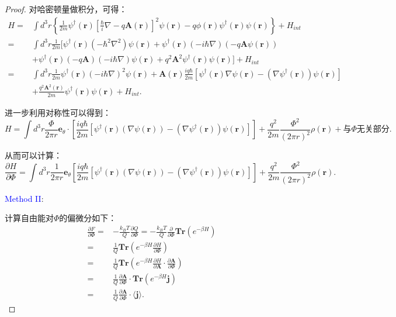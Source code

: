 \documentclass[reqno,a4paper,12pt]{amsart}
\begin{document}
\begin{proof}
对哈密顿量做积分，可得：
\begin{align*}
	H =& \int d^3 r \left\{ \frac{1}{2m}\psi^\dagger(\mathbf{r}) \left[ \frac{\hbar}{i}\nabla - q\mathbf{A}(\mathbf{r}) \right]^2 \psi(\mathbf{r}) - q\phi(\mathbf{r}) \psi^\dagger(\mathbf{r}) \psi(\mathbf{r}) \right\} + H_{int} \\
	=& \int d^3 r \frac{1}{2m} [ \psi^\dagger(\mathbf{r}) (-\hbar^2\nabla^2) \psi(\mathbf{r}) + \psi^\dagger(\mathbf{r})(-i\hbar\nabla)(-q\mathbf{A}\psi(\mathbf{r})) \\
	 &+ \psi^\dagger(\mathbf{r})(-q\mathbf{A})(-i\hbar\nabla)\psi(\mathbf{r}) + q^2\mathbf{A}^2 \psi^\dagger(\mathbf{r})\psi(\mathbf{r})] + H_{int} \\
	 =& \int d^3 r \frac{1}{2m}\psi^\dagger(\mathbf{r}) (-i\hbar\nabla)^2 \psi(\mathbf{r}) + \mathbf{A}(\mathbf{r})\frac{iq\hbar}{2m}[\psi^\dagger(\mathbf{r})\nabla\psi(\mathbf{r}) - (\nabla\psi^\dagger(\mathbf{r}))\psi(\mathbf{r})] \\
	 &+ \frac{q^2\mathbf{A}^2(\mathbf{r})}{2m} \psi^\dagger(\mathbf{r}) \psi(\mathbf{r}) + H_{int}.
\end{align*}

进一步利用对称性可以得到：
\[
	H = \int d^3 r \frac{\Phi}{2\pi r} \mathbf{e}_\theta \cdot \left[ \frac{iq\hbar}{2m}[\psi^\dagger(\mathbf{r})(\nabla \psi(\mathbf{r})) - (\nabla\psi^\dagger(\mathbf{r})) \psi(\mathbf{r})] \right] + \frac{q^2}{2m} \frac{\Phi^2}{(2\pi r)^2} \rho(\mathbf{r}) + \text{与$\Phi$无关部分}.
\]

从而可以计算：
\[
	\frac{\partial H}{\partial \Phi} = \int d^3 r \frac{1}{2\pi r} \mathbf{e}_\theta \left[ \frac{iq\hbar}{2m}[\psi^\dagger(\mathbf{r})(\nabla \psi(\mathbf{r})) - (\nabla\psi^\dagger(\mathbf{r})) \psi(\mathbf{r})] \right] + \frac{q^2}{2m} \frac{\Phi^2}{(2\pi r)^2} \rho(\mathbf{r}).
\]

\textcolor{blue}{Method II}:

计算自由能对$\Phi$的偏微分如下：
\begin{align*}
	\frac{\partial F}{\partial \Phi} =& -\frac{k_BT}{Q}\frac{\partial Q}{\partial \Phi} = -\frac{k_BT}{Q}\frac{\partial}{\partial \Phi} \mathbf{Tr}(e^{-\beta H}) \\
	=& \frac{1}{Q} \mathbf{Tr} \left( e^{-\beta H} \frac{\partial H}{\partial \Phi} \right) \\
	=& \frac{1}{Q} \mathbf{Tr} \left( e^{-\beta H} \frac{\partial H}{\partial \mathbf{A}} \cdot \frac{\partial \mathbf{A}}{\partial \Phi} \right) \\
	=& \frac{1}{Q} \frac{\partial \mathbf{A}}{\partial \Phi} \cdot \mathbf{Tr} \left( e^{-\beta H} \mathbf{j} \right) \\
	=& \frac{1}{Q} \frac{\partial \mathbf{A}}{\partial \Phi} \cdot \langle \mathbf{j} \rangle.
\end{align*}


\end{proof}
\end{document}
